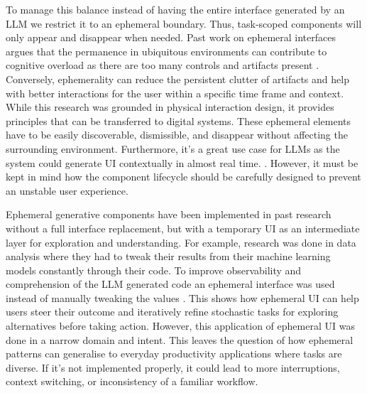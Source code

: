 To manage this balance instead of having the entire interface generated by an LLM we restrict it to an ephemeral boundary. Thus, task-scoped components will only appear and disappear when needed. Past work on ephemeral interfaces argues that the permanence in ubiquitous environments can contribute to cognitive overload as there are too many controls and artifacts present \parencite{Doring2013EphemeralUI}. Conversely, ephemerality can reduce the persistent clutter of artifacts and help with better interactions for the user within a specific time frame and context. While this research was grounded in physical interaction design, it provides principles that can be transferred to digital systems. These ephemeral elements have to be easily discoverable, dismissible, and disappear without affecting the surrounding environment. Furthermore, it's a great use case for LLMs as the system could generate UI contextually in almost real time. \parencite{Bieniek2024GenerativeAI}. However, it must be kept in mind how the component lifecycle should be carefully designed to prevent an unstable user experience.

Ephemeral generative components have been implemented in past research without a full interface replacement, but with a temporary UI as an intermediate layer for exploration and understanding. For example, research was done in data analysis where they had to tweak their results from their machine learning models constantly through their code. To improve observability and comprehension of the LLM generated code an ephemeral interface was used instead of manually tweaking the values \parencite{Cheng2024Biscuit}. This shows how ephemeral UI can help users steer their outcome and iteratively refine stochastic tasks for exploring alternatives before taking action. However, this application of ephemeral UI was done in a narrow domain and intent. This leaves the question of how ephemeral patterns can generalise to everyday productivity applications where tasks are diverse. If it's not implemented properly, it could lead to more interruptions, context switching, or inconsistency of a familiar workflow.

